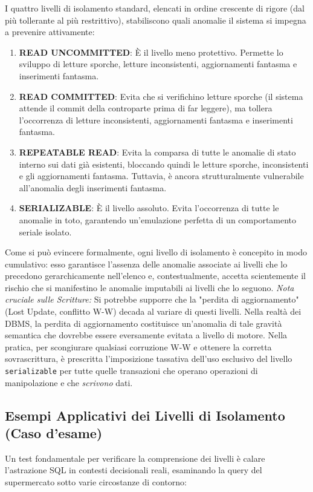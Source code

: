 I quattro livelli di isolamento standard, elencati in ordine crescente di rigore (dal più tollerante al più restrittivo), stabiliscono quali anomalie il sistema si impegna a prevenire attivamente:
\begin{enumerate}
    \item \textbf{READ UNCOMMITTED}: È il livello meno protettivo. Permette lo sviluppo di letture sporche, letture inconsistenti, aggiornamenti fantasma e inserimenti fantasma.
    \item \textbf{READ COMMITTED}: Evita che si verifichino letture sporche (il sistema attende il commit della controparte prima di far leggere), ma tollera l'occorrenza di letture inconsistenti, aggiornamenti fantasma e inserimenti fantasma.
    \item \textbf{REPEATABLE READ}: Evita la comparsa di tutte le anomalie di stato interno sui dati già esistenti, bloccando quindi le letture sporche, inconsistenti e gli aggiornamenti fantasma. Tuttavia, è ancora strutturalmente vulnerabile all'anomalia degli inserimenti fantasma.
    \item \textbf{SERIALIZABLE}: È il livello assoluto. Evita l'occorrenza di tutte le anomalie in toto, garantendo un'emulazione perfetta di un comportamento seriale isolato.
\end{enumerate}
Come si può evincere formalmente, ogni livello di isolamento è concepito in modo cumulativo: esso garantisce l'assenza delle anomalie associate ai livelli che lo precedono gerarchicamente nell'elenco e, contestualmente, accetta scientemente il rischio che si manifestino le anomalie imputabili ai livelli che lo seguono.
\textit{Nota cruciale sulle Scritture:} Si potrebbe supporre che la "perdita di aggiornamento" (Lost Update, conflitto W-W) decada al variare di questi livelli. Nella realtà dei DBMS, la perdita di aggiornamento costituisce un'anomalia di tale gravità semantica che dovrebbe essere eversamente evitata a livello di motore. Nella pratica, per scongiurare qualsiasi corruzione W-W e ottenere la corretta sovrascrittura, è prescritta l'imposizione tassativa dell'uso esclusivo del livello \texttt{serializable} per tutte quelle transazioni che operano operazioni di manipolazione e che \textit{scrivono} dati.

\subsection{Esempi Applicativi dei Livelli di Isolamento (Caso d'esame)}
Un test fondamentale per verificare la comprensione dei livelli è calare l'astrazione SQL in contesti decisionali reali, esaminando la query del supermercato sotto varie circostanze di contorno:

